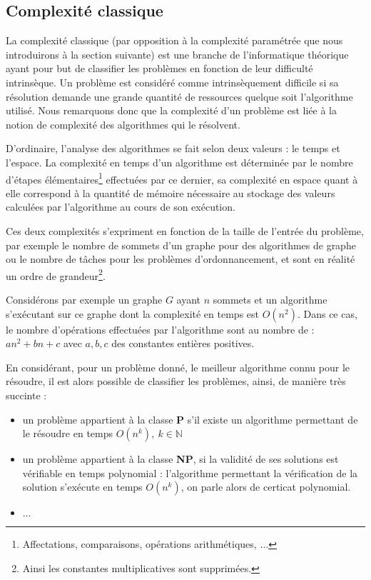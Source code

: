 \documentclass[a4paper,11pt]{report}
\begin{document}
\subsection{Complexité classique}

La complexité classique (par opposition à la complexité paramétrée que nous introduirons à la
section suivante) est une branche de l'informatique théorique ayant pour but de classifier les
problèmes en fonction de leur difficulté intrinsèque.  Un problème est considéré comme
intrinsèquement difficile si sa résolution demande une grande quantité de ressources quelque soit
l'algorithme utilisé. Nous remarquons donc que la complexité d'un problème est liée à la notion de
complexité des algorithmes qui le résolvent.

D'ordinaire, l'analyse des algorithmes se fait selon deux valeurs : le temps et l'espace. La
complexité en temps d'un algorithme est déterminée par le nombre d'étapes
élémentaires\footnote{Affectations, comparaisons, opérations arithmétiques, $\dots$} effectuées par
ce dernier, sa complexité en espace quant à elle correspond à la quantité de mémoire nécessaire au
stockage des valeurs calculées par l'algorithme au cours de son exécution.

Ces deux complexités s'expriment en fonction de la taille de l'entrée du problème, par exemple le
nombre de sommets d'un graphe pour des algorithmes de graphe ou le nombre de tâches pour les
problèmes d'ordonnancement, et sont en réalité un ordre de grandeur\footnote{Ainsi les constantes
multiplicatives sont supprimées.}. 

Considérons par exemple un graphe $G$ ayant $n$ sommets et un
algorithme s'exécutant sur ce graphe dont la complexité en temps est $O(n^2)$. Dans ce cas, le
nombre d'opérations effectuées par l'algorithme sont au nombre de : $an^2 + bn +c$ avec $a,b,c$ des
constantes entières positives.

En considérant, pour un problème donné, le meilleur algorithme connu pour le résoudre, il est alors
possible de classifier les problèmes, ainsi, de manière très succinte :
\begin{itemize}
    \item un problème appartient à la classe \textbf{P} s'il existe un algorithme
        permettant de le résoudre en temps $O(n^k),\ k \in \mathbb{N}$
    \item un problème appartient à la classe \textbf{NP}, si la validité de ses
        solutions est vérifiable en temps polynomial : l'algorithme permettant la vérification de la
        solution s'exécute en temps $O(n^k)$, on parle alors de certicat polynomial.
    \item $\dots$
\end{itemize}
\end{document}
